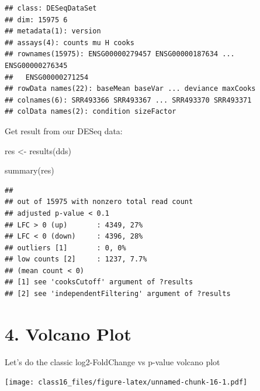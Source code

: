 \documentclass[
]{article}
\newenvironment{Shaded}{\begin{snugshade}}{\end{snugshade}}
\newcommand{\FunctionTok}[1]{\textcolor[rgb]{0.00,0.00,0.00}{#1}}
\newcommand{\NormalTok}[1]{#1}
\newcommand{\OtherTok}[1]{\textcolor[rgb]{0.56,0.35,0.01}{#1}}
\newcommand{\SpecialCharTok}[1]{\textcolor[rgb]{0.00,0.00,0.00}{#1}}
\begin{document}
\begin{verbatim}
## class: DESeqDataSet 
## dim: 15975 6 
## metadata(1): version
## assays(4): counts mu H cooks
## rownames(15975): ENSG00000279457 ENSG00000187634 ... ENSG00000276345
##   ENSG00000271254
## rowData names(22): baseMean baseVar ... deviance maxCooks
## colnames(6): SRR493366 SRR493367 ... SRR493370 SRR493371
## colData names(2): condition sizeFactor
\end{verbatim}

Get result from our DESeq data:

\begin{Shaded}
\begin{Highlighting}[]
\NormalTok{res }\OtherTok{\textless{}{-}}  \FunctionTok{results}\NormalTok{(dds)}
\end{Highlighting}
\end{Shaded}

\begin{Shaded}
\begin{Highlighting}[]
\FunctionTok{summary}\NormalTok{(res)}
\end{Highlighting}
\end{Shaded}

\begin{verbatim}
## 
## out of 15975 with nonzero total read count
## adjusted p-value < 0.1
## LFC > 0 (up)       : 4349, 27%
## LFC < 0 (down)     : 4396, 28%
## outliers [1]       : 0, 0%
## low counts [2]     : 1237, 7.7%
## (mean count < 0)
## [1] see 'cooksCutoff' argument of ?results
## [2] see 'independentFiltering' argument of ?results
\end{verbatim}

\hypertarget{volcano-plot}{%
\section{4. Volcano Plot}\label{volcano-plot}}

Let's do the classic log2-FoldChange vs p-value volcano plot

\begin{Shaded}
\end{Shaded}

\texttt{[image: class16\_files/figure-latex/unnamed-chunk-16-1.pdf]}
\end{document}

